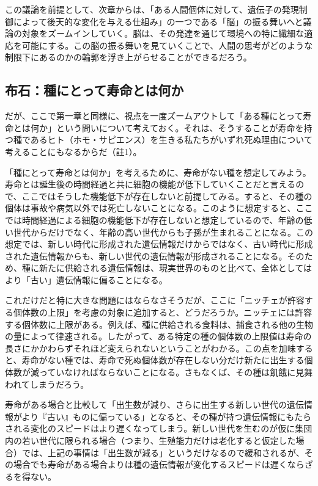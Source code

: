 この議論を前提として、次章からは、「ある人間個体に対して、遺伝子の発現制御によって後天的な変化を与える仕組み」の一つである「脳」の振る舞いへと議論の対象をズームインしていく。脳は、その発達を通じて環境への特に繊細な適応を可能にする。この脳の振る舞いを見ていくことで、人間の思考がどのような制限下にあるのかの輪郭を浮き上がらせることができるだろう。

\subsection{布石：種にとって寿命とは何か}\label{ux5e03ux77f3ux7a2eux306bux3068ux3063ux3066ux5bffux547dux3068ux306fux4f55ux304b}

だが、ここで第一章と同様に、視点を一度ズームアウトして「ある種にとって寿命とは何か」という問いについて考えておく。それは、そうすることが寿命を持つ種であるヒト（ホモ・サピエンス）を生きる私たちがいずれ死ぬ理由について考えることにもなるからだ（註1）。

「種にとって寿命とは何か」を考えるために、寿命がない種を想定してみよう。寿命とは誕生後の時間経過と共に細胞の機能が低下していくことだと言えるので、ここではそうした機能低下が存在しないと前提してみる。すると、その種の個体は事故や病気以外では死亡しないことになる。このように想定すると、ここでは時間経過による細胞の機能低下が存在しないと想定しているので、年齢の低い世代からだけでなく、年齢の高い世代からも子孫が生まれることになる。この想定では、新しい時代に形成された遺伝情報だけからではなく、古い時代に形成された遺伝情報からも、新しい世代の遺伝情報が形成されることになる。そのため、種に新たに供給される遺伝情報は、現実世界のものと比べて、全体としてはより「古い」遺伝情報に偏ることになる。

これだけだと特に大きな問題にはならなさそうだが、ここに「ニッチェが許容する個体数の上限」を考慮の対象に追加すると、どうだろうか。ニッチェには許容する個体数に上限がある。例えば、種に供給される食料は、捕食される他の生物の量によって律速される。したがって、ある特定の種の個体数の上限値は寿命の長さにかかわらずそれほど変えられないということがわかる。この点を加味すると、寿命がない種では、寿命で死ぬ個体数が存在しない分だけ新たに出生する個体数が減っていなければならないことになる。さもなくば、その種は飢餓に見舞われてしまうだろう。

寿命がある場合と比較して「出生数が減り、さらに出生する新しい世代の遺伝情報がより『古い』ものに偏っている」となると、その種が持つ遺伝情報にもたらされる変化のスピードはより遅くなってしまう。新しい世代を生むのが仮に集団内の若い世代に限られる場合（つまり、生殖能力だけは老化すると仮定した場合）では、上記の事情は「出生数が減る」というだけなるので緩和されるが、その場合でも寿命がある場合よりは種の遺伝情報が変化するスピードは遅くならざるを得ない。

